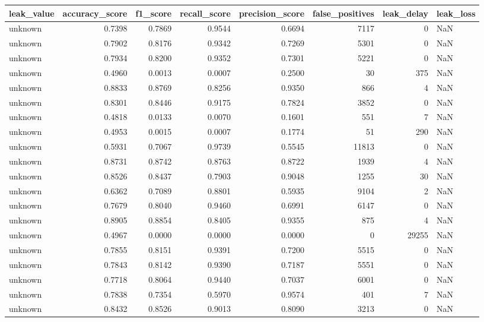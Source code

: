 \begin{tabular}{lrrrrrrl}
\toprule
leak\_value & accuracy\_score & f1\_score & recall\_score & precision\_score & false\_positives & leak\_delay & leak\_loss \\
\midrule
unknown & 0.7398 & 0.7869 & 0.9544 & 0.6694 & 7117 & 0 & NaN \\
unknown & 0.7902 & 0.8176 & 0.9342 & 0.7269 & 5301 & 0 & NaN \\
unknown & 0.7934 & 0.8200 & 0.9352 & 0.7301 & 5221 & 0 & NaN \\
unknown & 0.4960 & 0.0013 & 0.0007 & 0.2500 & 30 & 375 & NaN \\
unknown & 0.8833 & 0.8769 & 0.8256 & 0.9350 & 866 & 4 & NaN \\
unknown & 0.8301 & 0.8446 & 0.9175 & 0.7824 & 3852 & 0 & NaN \\
unknown & 0.4818 & 0.0133 & 0.0070 & 0.1601 & 551 & 7 & NaN \\
unknown & 0.4953 & 0.0015 & 0.0007 & 0.1774 & 51 & 290 & NaN \\
unknown & 0.5931 & 0.7067 & 0.9739 & 0.5545 & 11813 & 0 & NaN \\
unknown & 0.8731 & 0.8742 & 0.8763 & 0.8722 & 1939 & 4 & NaN \\
unknown & 0.8526 & 0.8437 & 0.7903 & 0.9048 & 1255 & 30 & NaN \\
unknown & 0.6362 & 0.7089 & 0.8801 & 0.5935 & 9104 & 2 & NaN \\
unknown & 0.7679 & 0.8040 & 0.9460 & 0.6991 & 6147 & 0 & NaN \\
unknown & 0.8905 & 0.8854 & 0.8405 & 0.9355 & 875 & 4 & NaN \\
unknown & 0.4967 & 0.0000 & 0.0000 & 0.0000 & 0 & 29255 & NaN \\
unknown & 0.7855 & 0.8151 & 0.9391 & 0.7200 & 5515 & 0 & NaN \\
unknown & 0.7843 & 0.8142 & 0.9390 & 0.7187 & 5551 & 0 & NaN \\
unknown & 0.7718 & 0.8064 & 0.9440 & 0.7037 & 6001 & 0 & NaN \\
unknown & 0.7838 & 0.7354 & 0.5970 & 0.9574 & 401 & 7 & NaN \\
unknown & 0.8432 & 0.8526 & 0.9013 & 0.8090 & 3213 & 0 & NaN \\
\bottomrule
\end{tabular}
